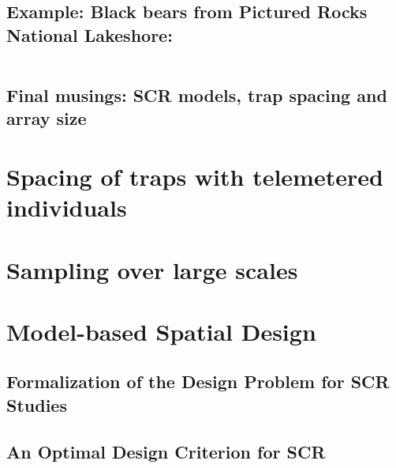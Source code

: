 \subsection{Example: Black bears from Pictured Rocks National Lakeshore: }

\begin{table}[ht]
  \centering
 
    \begin{tabular}{lcccc}

	\hline
 
    \end{tabular}
  \label{design.tab.bears}
\end{table}


\subsection {Final musings: SCR models, trap spacing and array size}


\section{ Spacing of traps with telemetered individuals}
\label{design.sec.telemetry}



\section {Sampling over large scales}



\section{Model-based Spatial Design}



\subsection{Formalization of the Design Problem for SCR Studies}




\subsection{An Optimal Design Criterion for SCR}


\begin{equation}
\label{design.eq.theQ}
\end{equation}


